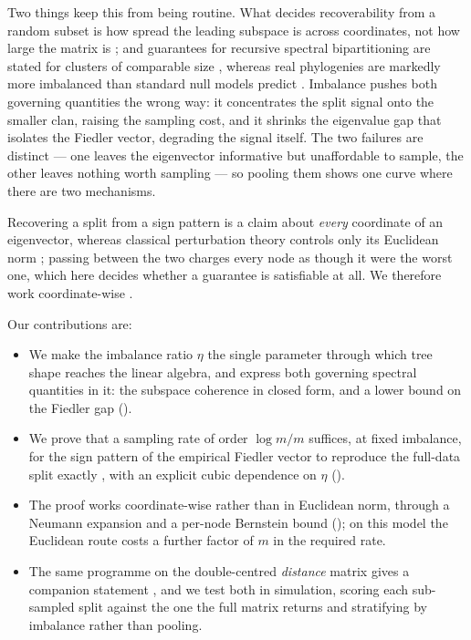 Two things keep this from being routine. What decides recoverability from a
random subset is how spread the leading subspace is across coordinates, not how
large the matrix is \cite{chen2014completing}; and guarantees for recursive
spectral bipartitioning are stated for clusters of comparable size
\cite{Balakrishnan2011clustering, qinrohe2013regularized}, whereas real
phylogenies are markedly more imbalanced than standard null models predict
\cite{blum2006which, yule1925mathematical, kingman1982coalescent,
steel2001properties, aldous2001stochastic}. Imbalance pushes both governing
quantities the wrong way: it concentrates the split signal onto the smaller clan,
raising the sampling cost, and it shrinks the eigenvalue gap that isolates the
Fiedler vector, degrading the signal itself. The two failures are distinct ---
one leaves the eigenvector informative but unaffordable to sample, the other
leaves nothing worth sampling --- so pooling them shows one curve where there are
two mechanisms.

Recovering a split from a sign pattern is a claim about \emph{every} coordinate
of an eigenvector, whereas classical perturbation theory controls only its
Euclidean norm \cite{davis1970rotation};
passing between the two charges every node as though it were the worst one, which
here decides whether a guarantee is satisfiable at all. We therefore work
coordinate-wise \cite{eldridge2017unperturbed, fan2018eigenvector,
abbe2020entrywise, tropp2012userfriendly}.

Our contributions are:
\begin{itemize}
\item We make the imbalance ratio $\eta$ the single parameter through which tree
shape reaches the linear algebra, and express both governing spectral quantities
in it: the subspace coherence in closed form, and a lower bound on the Fiedler
gap ().

\item We prove that a sampling rate of order $\log m/m$ suffices, at fixed
imbalance, for the sign pattern of the empirical Fiedler vector to reproduce the
full-data split exactly \hp, with an explicit cubic dependence on $\eta$
(). 

\item The proof works coordinate-wise rather than in Euclidean norm, through a
Neumann expansion and a per-node Bernstein bound (); on this
model the Euclidean route costs a further factor of $m$ in the required rate. 

\item The same programme on the double-centred \emph{distance} matrix gives a companion
statement \cite{Griffing2012, BandeltDress1992}, and we test both in simulation,
scoring each sub-sampled split against the one the full matrix returns
\cite{strehlghosh2002cluster, fortunato2010community} and stratifying by imbalance
rather than pooling.
\end{itemize}

